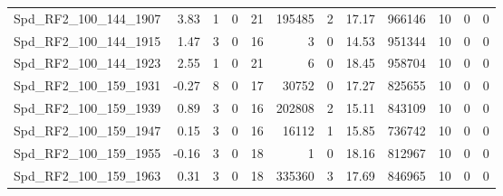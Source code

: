 \begin{longtable}[c]{@{}lrrrrrrrrrrr@{}}
Spd\_RF2\_100\_144\_1907      & 3.83                   & 1                       & 0                       & 21                     & 195485                  & 2                       & 17.17                   & 966146                   & 10                       & 0                        & 0                        \\
Spd\_RF2\_100\_144\_1915      & 1.47                   & 3                       & 0                       & 16                     & 3                       & 0                       & 14.53                   & 951344                   & 10                       & 0                        & 0                        \\
Spd\_RF2\_100\_144\_1923      & 2.55                   & 1                       & 0                       & 21                     & 6                       & 0                       & 18.45                   & 958704                   & 10                       & 0                        & 0                        \\
Spd\_RF2\_100\_159\_1931      & -0.27                  & 8                       & 0                       & 17                     & 30752                   & 0                       & 17.27                   & 825655                   & 10                       & 0                        & 0                        \\
Spd\_RF2\_100\_159\_1939      & 0.89                   & 3                       & 0                       & 16                     & 202808                  & 2                       & 15.11                   & 843109                   & 10                       & 0                        & 0                        \\
Spd\_RF2\_100\_159\_1947      & 0.15                   & 3                       & 0                       & 16                     & 16112                   & 1                       & 15.85                   & 736742                   & 10                       & 0                        & 0                        \\
Spd\_RF2\_100\_159\_1955      & -0.16                  & 3                       & 0                       & 18                     & 1                       & 0                       & 18.16                   & 812967                   & 10                       & 0                        & 0                        \\
Spd\_RF2\_100\_159\_1963      & 0.31                   & 3                       & 0                       & 18                     & 335360                  & 3                       & 17.69                   & 846965                   & 10                       & 0                        & 0                        \\

\end{longtable}
